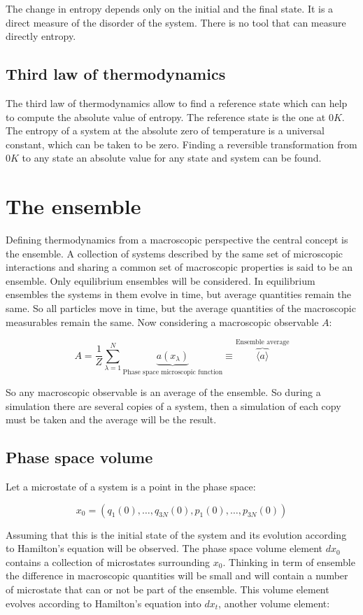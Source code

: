 	The change in entropy depends only on the initial and the final state.
	It is a direct measure of the disorder of the system.
	There is no tool that can measure directly entropy.

	\subsection{Third law of thermodynamics}
	The third law of thermodynamics allow to find a reference state which can help to compute the absolute value of entropy.
	The reference state is the one at $0K$.
	The entropy of a system at the absolute zero of temperature is a universal constant, which can be taken to be zero.
	Finding a reversible transformation from $0K$ to any state an absolute value for any state and system can be found.

\section{The ensemble}
Defining thermodynamics from a macroscopic perspective the central concept is the ensemble.
A collection of systems described by the same set of microscopic interactions and sharing a common set of macroscopic properties is said to be an ensemble.
Only equilibrium ensembles will be considered.
In equilibrium ensembles the systems in them evolve in time, but average quantities remain the same.
So all particles move in time, but the average quantities of the macroscopic measurables remain the same.
Now considering a macroscopic observable $A$:

$$A = \frac{1}{Z}\sum\limits_{\lambda=1}^N\underbrace{a(x_\lambda)}_{\text{Phase space microscopic function}}\equiv\overbrace{\langle a\rangle}^{\text{Ensemble average}}$$

So any macroscopic observable is an average of the ensemble.
So during a simulation there are several copies of a system, then a simulation of each copy must be taken and the average will be the result.

	\subsection{Phase space volume}
	Let a microstate of a system is a point in the phase space:

	$$x_0 = (q_1(0), \dots, q_{3N}(0), p_1(0), \dots, p_{3N}(0))$$

	Assuming that this is the initial state of the system and its evolution according to Hamilton's equation will be observed.
	The phase space volume element $dx_0$ contains a collection of microstates surrounding $x_0$.
	Thinking in term of ensemble the difference in macroscopic quantities will be small and will contain a number of microstate that can or not be part of the ensemble.
	This volume element evolves according to Hamilton's equation into $dx_t$, another volume element:

